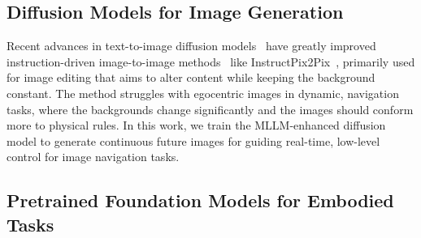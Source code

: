\subsection{Diffusion Models for Image Generation}


Recent advances in text-to-image diffusion models~\cite{dhariwal2021diffusion, ho2022classifier,nichol2021glide} have greatly improved instruction-driven image-to-image methods~\cite{brooks2023instructpix2pix,fu2023guiding,geng2024instructdiffusion,zhou2024minedreamer} like InstructPix2Pix~\cite{brooks2023instructpix2pix}, primarily used for image editing that aims to alter content while keeping the background constant. 
%
The method struggles with egocentric images in dynamic, navigation tasks, where the backgrounds change significantly and the images should conform more to physical rules.
% 
In this work, we train the MLLM-enhanced diffusion model to generate continuous future images for guiding real-time, low-level control for image navigation tasks.

\subsection{Pretrained Foundation Models for Embodied Tasks}


